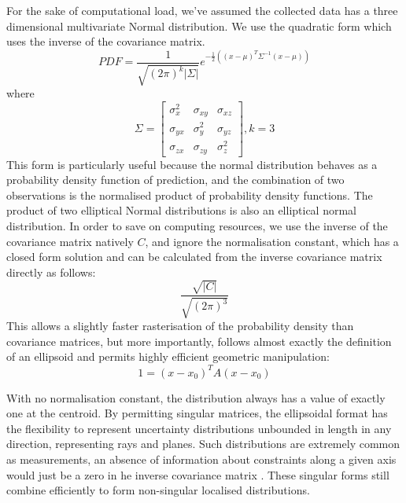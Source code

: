 \documentclass{article}
\newcounter{subsubsubsection}[subsubsection]
\begin{document}
        For the sake of computational load, we've assumed the collected data has a three dimensional multivariate Normal distribution.  We use the quadratic form which uses the inverse of the covariance matrix.
        \begin{equation}
        PDF = \frac{1}{\sqrt {(2\pi)^k|\Sigma|}} e^{-\frac{1}{2}\left( \left(x-\mu\right)^T \Sigma^{-1} \left(x-\mu\right) \right)}
        \end{equation}
        where
        \begin{equation}
        \Sigma=\begin{bmatrix}
          \sigma_x^2 & \sigma_{xy} & \sigma_{xz} \\[0.3em]
          \sigma_{yx} & \sigma_y^2 & \sigma_{yz} \\[0.3em]
          \sigma_{zx} & \sigma_{zy} & \sigma_z^2 
        \end{bmatrix}, k=3
        \end{equation}
        This form is particularly useful because the normal distribution behaves as a probability density function of prediction, and the combination of two observations is the normalised product of probability density functions.  The product of two elliptical Normal distributions is also an elliptical normal distribution.  
        In order to save on computing resources, we use the inverse of the covariance matrix natively \(C\), and ignore the normalisation constant, which has a closed form solution and can be calculated from the inverse covariance matrix directly as follows:
        \begin{equation}
        \frac{\sqrt{|C|}}{\sqrt{(2\pi)^3}}
        \end{equation}
        This allows a slightly faster rasterisation of the probability density than covariance matrices, but more importantly, follows almost exactly the definition of an ellipsoid and permits highly efficient geometric manipulation:
        \begin{equation}
        1 = \left(x-x_0\right)^T A \left(x-x_0\right)
        \end{equation}

        With no normalisation constant, the distribution always has a value of exactly one at the centroid.
        By permitting singular matrices, the ellipsoidal format has the flexibility to represent uncertainty distributions unbounded in length in any direction, representing rays and planes.  Such distributions are extremely common as measurements, an absence of information about constraints along a given axis would just be a zero in he inverse covariance matrix \cite{UncertainGeo}.  These singular forms still combine efficiently to form non-singular localised distributions.
        
\end{document}
